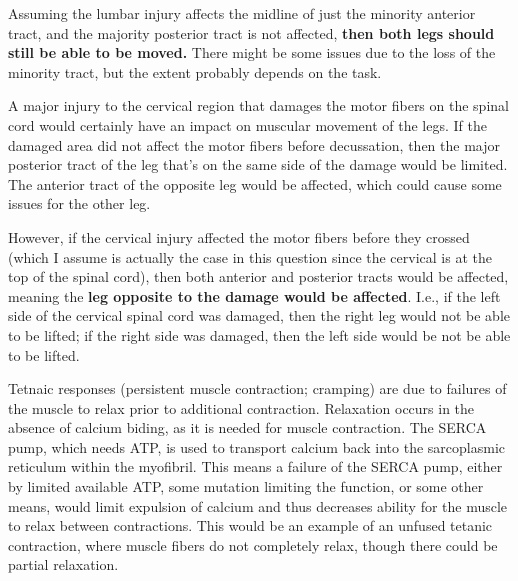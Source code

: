 \documentclass[plain,basic]{inVerba-notes}
\begin{document}
\begin{enumerate}
  Assuming the lumbar injury affects the midline of just the minority anterior tract, and the majority posterior tract is not affected, \textbf{then both legs should still be able to be moved.} There might be some issues due to the loss of the minority tract, but the extent probably depends on the task.



  A major injury to the cervical region that damages the motor fibers on the spinal cord would certainly have an impact on muscular movement of the legs. If the damaged area did not affect the motor fibers before decussation, then the major posterior tract of the leg that's on the same side of the damage would be limited. The anterior tract of the opposite leg would be affected, which could cause some issues for the other leg.  

  However, if the cervical injury affected the motor fibers before they crossed (which I assume is actually the case in this question since the cervical is at the top of the spinal cord), then both anterior and posterior tracts would be affected, meaning the \textbf{leg opposite to the damage would be affected}. I.e., if the left side of the cervical spinal cord was damaged, then the right leg would not be able to be lifted; if the right side was damaged, then the left side would be not be able to be lifted.



  Tetnaic responses (persistent muscle contraction; cramping) are due to failures of the muscle to relax prior to additional contraction. Relaxation occurs in the absence of calcium biding, as it is needed for muscle contraction. The SERCA pump, which needs ATP, is used to transport calcium back into the sarcoplasmic reticulum within the myofibril. This means a failure of the SERCA pump, either by limited available ATP, some mutation limiting the function, or some other means, would limit expulsion of calcium and thus decreases ability for the muscle to relax between contractions. This would be an example of an unfused tetanic contraction, where muscle fibers do not completely relax, though there could be partial relaxation. 


\end{enumerate}
\end{document}
